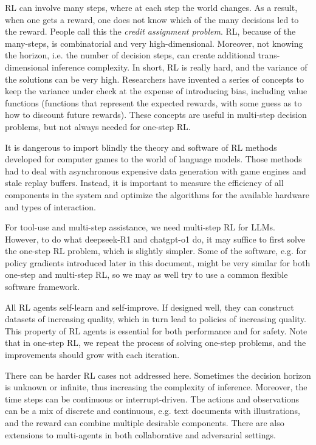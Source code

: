 \documentclass{article}
\begin{document}
RL can involve many steps, where at each step the world changes. As a result, when one gets a reward, one does not know which of the many decisions led to the reward. People call this the \emph{credit assignment problem}. RL, because of the many-steps, is combinatorial and very high-dimensional. Moreover, not knowing the horizon, i.e. the number of decision steps, can create additional trans-dimensional inference complexity. In short, RL is really hard, and the variance of the solutions can be very high. Researchers have invented a series of concepts to keep the variance under check at the expense of introducing bias, including value functions (functions that represent the expected rewards, with some guess as to how to discount future rewards). These concepts are useful in multi-step decision problems, but not always needed for one-step RL.

It is dangerous to import blindly the theory and software of RL methods developed for computer games to the world of language models. Those methods had to deal with asynchronous expensive data generation with game engines and stale replay buffers. Instead, it is important to measure the efficiency of all components in the system and optimize the algorithms for the available hardware and types of interaction.

For tool-use and multi-step assistance, we need multi-step RL for LLMs. However, to do what deepseek-R1 and chatgpt-o1 do, it may suffice to first solve the one-step RL problem, which is slightly simpler. Some of the software, e.g. for policy gradients introduced later in this document, might be very similar for both one-step and multi-step RL, so we may as well try to use a common flexible software framework.

All RL agents self-learn and self-improve. If designed well, they can construct datasets of increasing quality, which in turn lead to policies of increasing quality. This property of RL agents is essential for both performance and for safety. Note that in one-step RL, we repeat the process of solving one-step problems, and the improvements should grow with each iteration.

There can be harder RL cases not addressed here. Sometimes the decision horizon is unknown or infinite, thus increasing the complexity of inference. Moreover, the time steps can be continuous or interrupt-driven. The actions and observations can be a mix of discrete and continuous, e.g. text documents with illustrations, and the reward can combine multiple desirable components. There are also extensions to multi-agents in both collaborative and adversarial settings.
\end{document}

